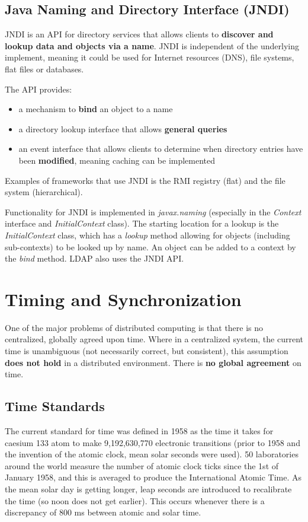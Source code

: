 \documentclass{article}
\begin{document}
\subsection{Java Naming and Directory Interface (JNDI)}

JNDI is an API for directory services that allows clients to \textbf{discover and lookup data and objects via a name}. JNDI is independent of the underlying implement, meaning it could be used for Internet resources (DNS), file systems, flat files or databases.

The API provides:
\begin{itemize}
	\item a mechanism to \textbf{bind} an object to a name
	\item a directory lookup interface that allows \textbf{general queries}
	\item an event interface that allows clients to determine when directory entries have been \textbf{modified}, meaning caching can be implemented
\end{itemize}
Examples of frameworks that use JNDI is the RMI registry (flat) and the file system (hierarchical).

Functionality for JNDI is implemented in \textit{javax.naming} (especially in the \textit{Context} interface and \textit{InitialContext} class). The starting location for a lookup is the \textit{InitialContext} class, which has a \textit{lookup} method allowing for objects (including sub-contexts) to be looked up by name. An object can be added to a context by the \textit{bind} method. LDAP also uses the JNDI API.

\section{Timing and Synchronization}

One of the major problems of distributed computing is that there is no centralized, globally agreed upon time. Where in a centralized system, the current time is unambiguous (not necessarily correct, but consistent), this assumption \textbf{does not hold} in a distributed environment. There is \textbf{no global agreement} on time.

\subsection{Time Standards}

The current standard for time was defined in 1958 as the time it takes for caesium 133 atom to make 9,192,630,770 electronic transitions (prior to 1958 and the invention of the atomic clock, mean solar seconds were used). 50 laboratories around the world measure the number of atomic clock ticks since the 1st of January 1958, and this is averaged to produce the International Atomic Time. As the mean solar day is getting longer, leap seconds are introduced to recalibrate the time (so noon does not get earlier). This occurs whenever there is a discrepancy of 800 ms between atomic and solar time.
\end{document}
